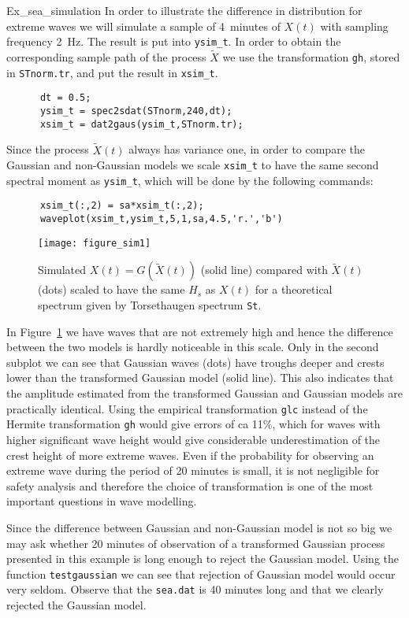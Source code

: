 \begin{cex}{Ex_sea_simulation}
In order to illustrate the difference in distribution for extreme waves
we will simulate a sample of 4~minutes of $X(t)$ with sampling
frequency 2~Hz. The result is put into \verb+ysim_t+.
In order to obtain the corresponding sample
path of the process $\widetilde X$ we use the transformation {\tt gh},
stored in {\tt STnorm.tr}, and put the result in \verb+xsim_t+.
{\small\begin{verbatim}
      dt = 0.5;
      ysim_t = spec2sdat(STnorm,240,dt);
      xsim_t = dat2gaus(ysim_t,STnorm.tr);
\end{verbatim}}
Since the process $\tilde X(t)$ always has variance one, in order to
compare the Gaussian and non-Gaussian models we scale
\verb+xsim_t+ %
to have the same second spectral moment as
\verb+ysim_t+,  %
which will be done by the following commands:
{\small\begin{verbatim}
      xsim_t(:,2) = sa*xsim_t(:,2);
      waveplot(xsim_t,ysim_t,5,1,sa,4.5,'r.','b')
\end{verbatim}}
\begin{figure}[t]
\centering
\texttt{[image: figure\_sim1]}
\vspace{-3mm}
  \caption[Gaussian simulated and transformed signals]{%
Simulated  $X(t)=G(\widetilde X(t))$ (solid line) compared
    with $\widetilde X(t)$ (dots) scaled to have the same $H_s$ as $X(t)$ for
    a theoretical
    spectrum  given by Torsethaugen spectrum {\tt St}.}
  \label{fig4-2}
\end{figure}

In Figure~\ref{fig4-2} we have waves that are not
extremely high and hence the difference between the two models is
hardly noticeable in this scale. Only in the second subplot we can see
that Gaussian waves (dots) have troughs deeper and crests lower than
the transformed Gaussian model (solid line). This also indicates
that the amplitude estimated from the transformed Gaussian and Gaussian
models are practically identical. Using the empirical transformation
{\tt glc} instead of the Hermite transformation
{\tt gh} would give errors of ca 11\%,
which for waves with higher significant wave height would give considerable
underestimation of the crest height of more extreme waves.
Even if the probability for observing an extreme wave during
the period of 20 minutes is small, it is not negligible for safety
analysis and therefore the choice of transformation is one of the most
important questions in wave modelling.

Since the difference between Gaussian and non-Gaussian model is not
so big we may ask whether 20 minutes of observation
of a transformed Gaussian process presented in this example is long enough
to reject the Gaussian model. Using the function {\tt testgaussian}
we can see that rejection of Gaussian model would occur very seldom.
Observe that the {\tt sea.dat} is 40 minutes long and that we
clearly rejected the Gaussian model.
\end{cex}


